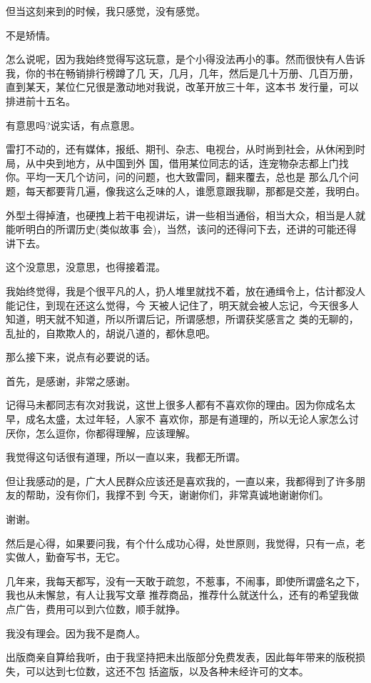 \documentclass[11pt,a4paper,onecolumn]{article}
\begin{document}
但当这刻来到的时候，我只感觉，没有感觉。

不是矫情。

怎么说呢，因为我始终觉得写这玩意，是个小得没法再小的事。然而很快有人告诉我，你的书在畅销排行榜蹲了几
天，几月，几年，然后是几十万册、几百万册，直到某天，某位仁兄很是激动地对我说，改革开放三十年，这本书
发行量，可以排进前十五名。

有意思吗?说实话，有点意思。

雷打不动的，还有媒体，报纸、期刊、杂志、电视台，从时尚到社会，从休闲到时局，从中央到地方，从中国到外
国，借用某位同志的话，连宠物杂志都上门找你。平均一天几个访问，问的问题，也大致雷同，翻来覆去，总也是
那么几个问题，每天都要背几遍，像我这么乏味的人，谁愿意跟我聊，那都是交差，我明白。

外型土得掉渣，也硬拽上若干电视讲坛，讲一些相当通俗，相当大众，相当是人就能听明白的所谓历史(类似故事
会)，当然，该问的还得问下去，还讲的可能还得讲下去。

这个没意思，没意思，也得接着混。

我始终觉得，我是个很平凡的人，扔人堆里就找不着，放在通缉令上，估计都没人能记住，到现在还这么觉得，今
天被人记住了，明天就会被人忘记，今天很多人知道，明天就不知道，所以所谓后记，所谓感想，所谓获奖感言之
类的无聊的，乱扯的，自欺欺人的，胡说八道的，都休息吧。

那么接下来，说点有必要说的话。

首先，是感谢，非常之感谢。

记得马未都同志有次对我说，这世上很多人都有不喜欢你的理由。因为你成名太早，成名太盛，太过年轻，人家不
喜欢你，那是有道理的，所以无论人家怎么讨厌你，怎么逗你，你都得理解，应该理解。

我觉得这句话很有道理，所以一直以来，我都无所谓。

但让我感动的是，广大人民群众应该还是喜欢我的，一直以来，我都得到了许多朋友的帮助，没有你们，我撑不到
今天，谢谢你们，非常真诚地谢谢你们。

谢谢。

然后是心得，如果要问我，有个什么成功心得，处世原则，我觉得，只有一点，老实做人，勤奋写书，无它。

几年来，我每天都写，没有一天敢于疏忽，不惹事，不闹事，即使所谓盛名之下，我也从未懈怠，有人让我写文章
推荐商品，推荐什么就送什么，还有的希望我做点广告，费用可以到六位数，顺手就挣。

我没有理会。因为我不是商人。

出版商亲自算给我听，由于我坚持把未出版部分免费发表，因此每年带来的版税损失，可以达到七位数，这还不包
括盗版，以及各种未经许可的文本。
\end{document}
